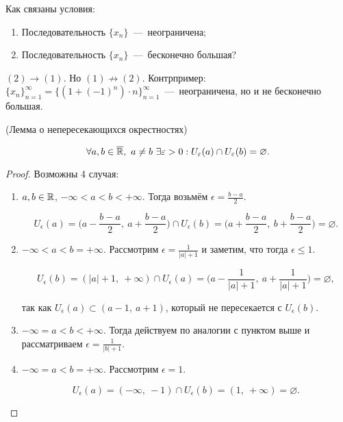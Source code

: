 \begin{problem}
    Как связаны условия:
    \begin{enumerate}
        \item Последовательность $\{ x_{n} \}$~---~неограничена;
        \item Последовательность $\{ x_{n} \}$~---~бесконечно большая?
    \end{enumerate}
\end{problem}
\begin{solution}
    $(2)\rightarrow (1).$ Но $(1) \nrightarrow (2).$ Контрпример: $\{ x_{n} \}^{\infty}_{n = 1} = \{ (1 + (-1)^{n}) \cdot n \}^{\infty}_{n = 1}$~---~неограничена, но и не бесконечно большая.
\end{solution}
\begin{lemma}
    (Лемма о непересекающихся окрестностях)

    $$ \forall a, b \in \overline{\mathbb{R}}, \  a \neq b \  \exists \varepsilon > 0: U_{\varepsilon} (a) \cap U_{\varepsilon} (b) = \varnothing.$$
\end{lemma}
\begin{proof}
    Возможны 4 случая:
    
    \begin{enumerate}
        \item $a, b \in \mathbb{R}$, $-\infty < a < b < +\infty.$ Тогда возьмём $\displaystyle \epsilon = \frac{b - a}{2}.$

        $$\displaystyle U_{\epsilon} (a) = \bigg( a - \frac{b - a}{2}, \  a + \frac{b - a}{2} \bigg) \cap U_{\epsilon} (b) = \bigg( a + \frac{b - a}{2}, \  b + \frac{b - a}{2} \bigg) = \varnothing.$$
        \item $-\infty < a < b = +\infty.$ Рассмотрим $\displaystyle \epsilon = \frac{1}{|a| + 1}$ и заметим, что тогда $\epsilon \leq 1.$

        $$\displaystyle U_{\epsilon} (b) = (|a| + 1, \  +\infty) \cap U_{\epsilon} (a) = \bigg (a - \frac{1}{|a| + 1}, \  a + \frac{1}{|a| + 1} \bigg) = \varnothing,$$

        так как $U_{\epsilon} (a) \subset (a - 1, \  a + 1)$, который не пересекается с $U_{\epsilon} (b).$

        \newpage

        \item $-\infty = a < b < +\infty$. Тогда действуем по аналогии с пунктом выше и рассматриваем $\displaystyle \epsilon = \frac{1}{|b| + 1}.$

        \item $-\infty = a < b = +\infty.$ Рассмотрим $\epsilon = 1.$

        $$ U_{\epsilon} (a) = (-\infty, \ -1) \cap U_{\epsilon} (b) = (1, \ +\infty) = \varnothing. $$
    \end{enumerate}
\end{proof}
